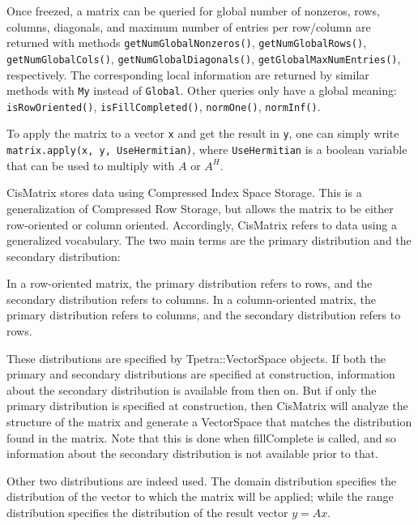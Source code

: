 \smallskip

Once freezed, a matrix can be queried for
global number of nonzeros, rows, columns, diagonals, and maximum
number of entries per row/column are returned with methods
\verb!getNumGlobalNonzeros()!,
\verb!getNumGlobalRows()!,
\verb!getNumGlobalCols()!,
\verb!getNumGlobalDiagonals()!,
\verb!getGlobalMaxNumEntries()!, respectively. The corresponding local
information are returned by similar methods with \verb!My! instead of
\verb!Global!. Other queries only have a global meaning: 
\verb!isRowOriented()!, \verb!isFillCompleted()!, \verb!normOne()!, 
  \verb!normInf()!.

\smallskip

To apply the matrix to a vector \verb!x! and get the result in
\verb!y!, one can simply write \verb!matrix.apply(x, y, UseHermitian)!, where
\verb!UseHermitian! is a boolean variable that can be used to multiply with
$A$ or $A^H$.

\smallskip

CisMatrix stores data using
Compressed Index Space Storage. This is a generalization of
Compressed Row Storage, but allows the matrix to be either
row-oriented or column oriented. Accordingly, CisMatrix refers to
data using a generalized vocabulary. The two main terms are the
primary distribution and the secondary distribution:

In a row-oriented matrix, the primary distribution refers to rows,
  and the secondary distribution refers to columns. In a
  column-oriented matrix, the primary distribution refers to columns,
  and the secondary distribution refers to rows.

  These distributions are specified by Tpetra::VectorSpace objects. If
  both the primary and secondary distributions are specified at
  construction, information about the secondary distribution is
  available from then on. But if only the primary distribution is
  specified at construction, then CisMatrix will analyze the structure
  of the matrix and generate a VectorSpace that matches the
  distribution found in the matrix. Note that this is done when
  fillComplete is called, and so information about the secondary
  distribution is not available prior to that.

Other two distributions are indeed used. The domain distribution specifies the
distribution of the vector to which the matrix will be applied; while the
range distribution specifies the distribution of the result vector $y = A x$.

